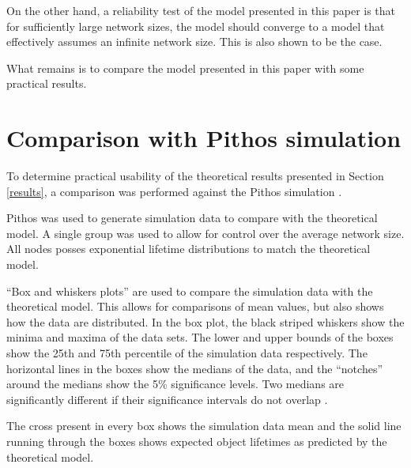 \documentclass[10pt,a4paper,conference]{IEEEtran}
\begin{document}
On the other hand, a reliability test of the model presented in this paper is that for sufficiently large network sizes, the model should converge to a model that effectively assumes an infinite network size. This is also shown to be the case.

What remains is to compare the model presented in this paper with some practical results.

\section{Comparison with Pithos simulation}
\label{simulation}

To determine practical usability of the theoretical results presented in Section \ref{results}, a comparison was performed against the Pithos simulation \cite{Pithos_mmve_2011}.


Pithos was used to generate simulation data to compare with the theoretical model. A single group was used to allow for control over the average network size. All nodes posses exponential lifetime distributions to match the theoretical model.

``Box and whiskers plots'' are used to compare the simulation data with the theoretical model. This allows for comparisons of mean values, but also shows how the data are distributed. In the box plot, the black striped whiskers show the minima and maxima of the data sets. The lower and upper bounds of the boxes show the 25th and 75th percentile of the simulation data respectively. The horizontal lines in the boxes show the medians of the data, and the ``notches'' around the medians show the 5\% significance levels. Two medians are significantly different if their significance intervals do not overlap \cite{}.

The cross present in every box shows the simulation data mean and the solid line running through the boxes shows expected object lifetimes as predicted by the theoretical model.
\end{document}
